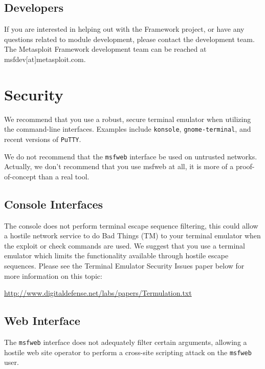 \documentclass{report}
\begin{document}
\section{Developers}
\par
If you are interested in helping out with the Framework project, or have any
questions related to module development, please contact the development team. The
Metasploit Framework development team can be reached at msfdev[at]metasploit.com.

\pagebreak
\appendix

\pagebreak
\chapter{Security}

\par
We recommend that you use a robust, secure terminal emulator when
utilizing the command-line interfaces. Examples include \texttt{konsole},
\texttt{gnome-terminal}, and recent versions of \texttt{PuTTY}.

\par
We do not recommend that the \texttt{msfweb} interface be used on untrusted
networks. Actually, we don't recommend that you use msfweb at all, it is
more of a proof-of-concept than a real tool.



	\section{Console Interfaces}
\par
The console does not perform terminal escape sequence filtering, this
could allow a hostile network service to do Bad Things (TM) to your terminal
emulator when the exploit or check commands are used. We suggest that you
use a terminal emulator which limits the functionality available through
hostile escape sequences. Please see the Terminal Emulator Security Issues paper
below for more information on this topic:

\url{http://www.digitaldefense.net/labs/papers/Termulation.txt}


	\section{Web Interface}
\par
The \texttt{msfweb} interface does not adequately filter certain arguments,
allowing a hostile web site operator to perform a cross-site scripting
attack on the \texttt{msfweb} user.
\end{document}
